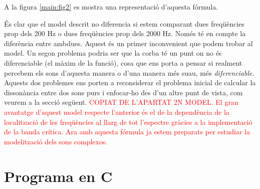 \documentclass{article}
\theoremstyle{math}
\newcommand{\0}{\ensuremath{\vb{0}}}
\begin{document}
A la figura \ref{main:fig2} es mostra una representació d'aquesta fórmula.
\begin{center}
    
    \label{main:fig2}
\end{center}
És clar que el model descrit no diferencia si estem comparant dues freqüències prop dels 200 Hz o dues freqüències prop dels 2000 Hz. Només té en compte la diferència entre ambdues. Aquest és un primer inconvenient que podem trobar al model. Un segon problema podria ser que la corba té un punt on no és diferenciable (el màxim de la funció), cosa que ens porta a pensar si realment percebem els sons d'aquesta manera o d'una manera més suau, més \textit{diferenciable}. Aquests dos problemes ens porten a reconsiderar el problema inicial de calcular la dissonància entre dos sons purs i enfocar-ho des d'un altre punt de vista, com veurem a la secció següent.
\textcolor{red}{COPIAT DE L'APARTAT 2N MODEL. El gran avantatge d'aquest model respecte l'anterior és el de la dependència de la localització de les freqüències al llarg de tot l'espectre gràcies a la implementació de la banda crítica. Ara amb aquesta fórmula ja estem preparats per estudiar la modelització dels sons complexos.}
\section{Programa en C}\label{appendix1}
%
\end{document}
